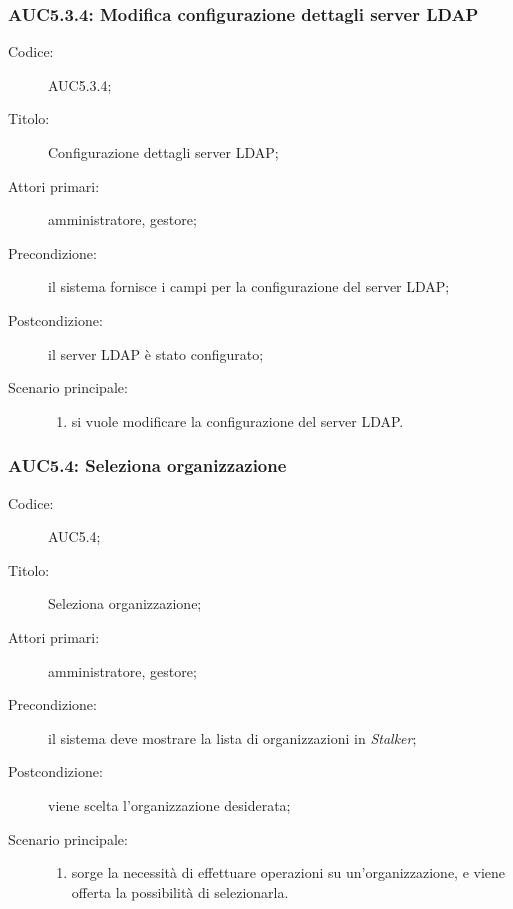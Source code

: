 \documentclass[../../../analisi-dei-requisiti.tex]{subfiles}
\begin{document}
\subsubsection{AUC5.3.4: Modifica configurazione dettagli server LDAP}%
\label{subs:AUC5.3.4}
\begin{description}
  \item[Codice:] AUC5.3.4;
  \item[Titolo:] Configurazione dettagli server LDAP;
  \item[Attori primari:] amministratore, gestore;
  \item[Precondizione:] il sistema fornisce i campi per la configurazione del server LDAP;
  \item[Postcondizione:] il server LDAP è stato configurato;
  \item[Scenario principale:]
        \begin{enumerate}
          \item si vuole modificare la configurazione del server LDAP.
        \end{enumerate}
\end{description}

\subsubsection{AUC5.4: Seleziona organizzazione}%
\label{subs:AUC5.4}
\begin{description}
  \item[Codice:] AUC5.4;
  \item[Titolo:] Seleziona organizzazione;
  \item[Attori primari:] amministratore, gestore;
  \item[Precondizione:] il sistema deve mostrare la lista di organizzazioni in \emph{Stalker};
  \item[Postcondizione:] viene scelta l'organizzazione desiderata;
  \item[Scenario principale:]
        \begin{enumerate}
          \item sorge la necessità di effettuare operazioni su un'organizzazione, e viene offerta la possibilità di selezionarla.
        \end{enumerate}
\end{description}
\end{document}
